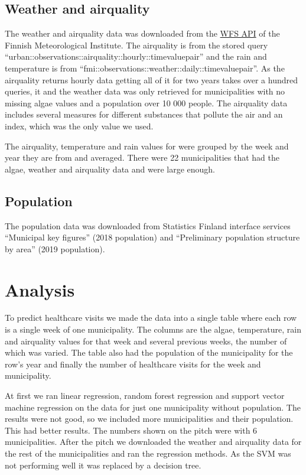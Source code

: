 \documentclass[a4paper, 12pt, english]{article}
\begin{document}
\subsection{Weather and airquality}
The weather and airquality data was downloaded from the
\href{https://ilmatieteenlaitos.fi/tallennetut-kyselyt}{WFS API}
of the Finnish Meteorological Institute.
The airquality is from the stored query
\mbox{``urban::observations::airquality::hourly::timevaluepair''}
and the rain and temperature is from
\mbox{``fmi::observations::weather::daily::timevaluepair''}.
As the airquality returns hourly data getting all of it
for two years takes over a hundred queries,
it and the weather data was only retrieved for
municipalities with no missing algae values and
a population over 10 000 people. The airquality data includes
several measures for different substances that
pollute the air and an index, which was the only value
we used.

The airquality, temperature and rain values for were
grouped by the week and year they are from and
averaged. There were 22 municipalities that had the
algae, weather and airquality data and were large
enough.

\subsection{Population}
The population data was downloaded from Statistics Finland interface services
``Municipal key figures'' (2018 population) and
``Preliminary population structure by area'' (2019 population).

\section{Analysis}
To predict healthcare visits we made the data into a
single table where each row is a single week of one
municipality. The columns are the algae, temperature,
rain and airquality values for that week and several
previous weeks, the number of which was varied.
The table also had the population of the municipality
for the row's year and finally the number of healthcare
visits for the week and municipality.

At first we ran linear regression, random forest regression
and support vector machine regression on the data for just
one municipality without population. The results were not good,
so we included more municipalities and their population.
This had better results. The numbers shown on the
pitch were with 6 municipalities. After the pitch we
downloaded the weather and airquality data for
the rest of the municipalities and ran the regression
methods. As the SVM was not performing well it was
replaced by a decision tree.
\end{document}
